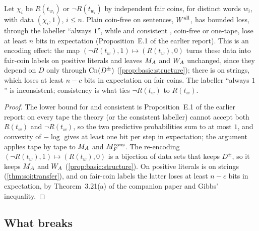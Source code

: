 \begin{remark}\label{rem:soi:encoding}
Let $\chi_i$ be $R(t_{w_i})$ or $\neg R(t_{w_i})$ by independent fair coins, for distinct words $w_i$, with data $(\chi_i,1)$, $i\le n$. Plain coin-free \SOIabbr on sentences, $W^{\mathrm{all}}$, has bounded loss, through the labeller ``always $1$'', while \SAIabbr and consistent \SOIabbr, coin-free or one-tape, lose at least $n$ bits in expectation (Proposition~E.1 of the earlier report). This is an encoding effect: the map $(\neg R(t_w),1)\mapsto(R(t_w),0)$ turns these data into fair-coin labels on positive literals and leaves $M_{A}$ and $W_{A}$ unchanged, since they depend on $D$ only through $\mathrm{Cn}(D^\pm)$ (\cref{prop:basic:structure}); there \SAIabbr is \SOIabbr on strings, which loses at least $n-c$ bits in expectation on fair coins. The labeller ``always $1$'' is inconsistent; consistency is what ties $\neg R(t_w)$ to $R(t_w)$.
\end{remark}

\begin{proof}
The lower bound for \SAIabbr and consistent \SOIabbr is Proposition~E.1 of the earlier report: on every tape the theory (or the consistent labeller) cannot accept both $R(t_w)$ and $\neg R(t_w)$, so the two predictive probabilities sum to at most $1$, and convexity of $-\log$ gives at least one bit per step in expectation; the argument applies tape by tape to $M_{A}$ and $M_{F}^{\mathrm{cons}}$. The re-encoding $(\neg R(t_w),1)\mapsto(R(t_w),0)$ is a bijection of data sets that keeps $D^\pm$, so it keeps $M_{A}$ and $W_{A}$ (\cref{prop:basic:structure}). On positive literals \SAIabbr is \SOIabbr on strings (\cref{thm:soi:transfer}), and on fair-coin labels the latter loses at least $n-c$ bits in expectation, by Theorem~3.21(a) of the companion paper and Gibbs' inequality.
\end{proof}

\subsection{What breaks}\label{sec:app:soi:breaks}

